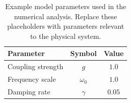 \begin{table}[b]
  \caption{\label{tab:model-parameters}
  Example model parameters used in the numerical analysis. Replace these
  placeholders with parameters relevant to the physical system.}
  \begin{ruledtabular}
    \begin{tabular}{lcc}
      Parameter & Symbol & Value \\
      \hline
      Coupling strength & $g$ & $1.0$ \\
      Frequency scale & $\omega_0$ & $1.0$ \\
      Damping rate & $\gamma$ & $0.05$ \\
    \end{tabular}
  \end{ruledtabular}
\end{table}
